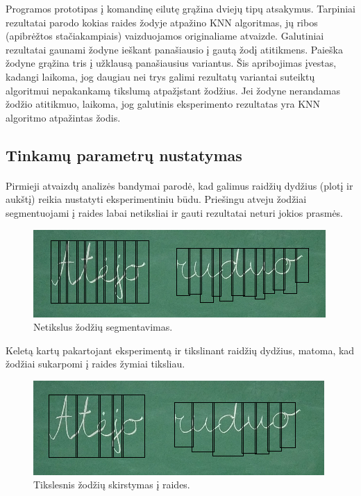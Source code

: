 \documentclass[a4paper,12pt]{article}
\begin{document}
Programos prototipas į komandinę eilutę grąžina dviejų tipų atsakymus. Tarpiniai rezultatai parodo kokias raides žodyje atpažino KNN algoritmas, jų ribos (apibrėžtos stačiakampiais) vaizduojamos originaliame atvaizde. Galutiniai rezultatai gaunami žodyne ieškant panašiausio į gautą žodį atitikmens. Paieška žodyne grąžina tris į užklausą panašiausius variantus. Šis apribojimas įvestas, kadangi laikoma, jog daugiau nei trys galimi rezultatų variantai suteiktų algoritmui nepakankamą tikslumą atpažįstant žodžius.
 Jei žodyne nerandamas žodžio atitikmuo, laikoma, jog galutinis eksperimento rezultatas yra KNN algoritmo atpažintas žodis.


\subsection{Tinkamų parametrų nustatymas}
\paragraph{} Pirmieji atvaizdų analizės bandymai parodė, kad galimus raidžių dydžius (plotį ir aukštį) reikia nustatyti eksperimentiniu būdu. Priešingu atveju žodžiai segmentuojami į raides labai netiksliai ir gauti rezultatai neturi jokios prasmės.
		\begin{figure}[H]
			\centering
			\includegraphics[scale=0.6]{images/wrongsegmentation}
			\caption{Netikslus žodžių segmentavimas.}   %
			\label{img:wrongsegmentation}
		\end{figure}

Keletą kartų pakartojant eksperimentą ir tikslinant raidžių dydžius, matoma, kad žodžiai sukarpomi į raides žymiai tiksliau.
	\begin{figure}[H]
		\centering
		\includegraphics[scale=0.6]{images/rightsegmentation}
		\caption{Tikslesnis žodžių skirstymas į raides.}   %
		\label{img:rightsegmentation}
	\end{figure}
	
\end{document}

